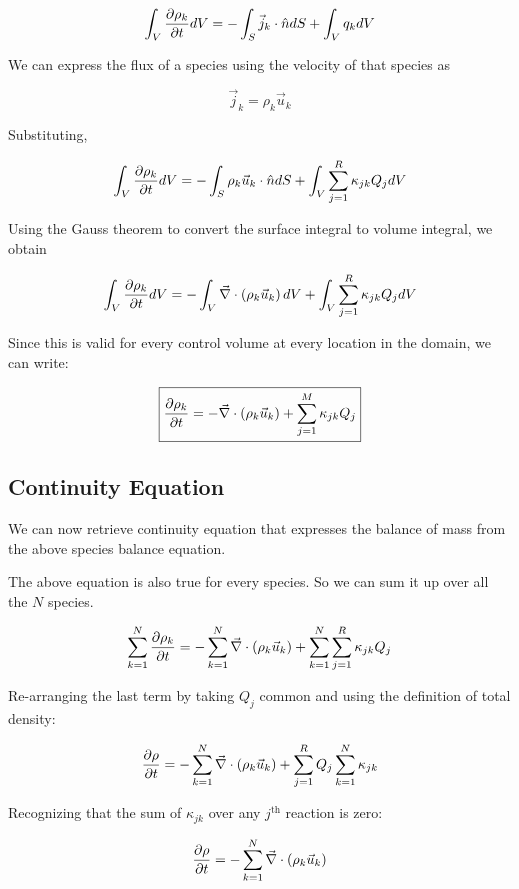 $$ \int_{V}{ {\partial \rho_k \over \partial t} dV} = - \int_{S}{ \vec{j}_k
\cdot
\hat{n} dS} + \int_{V}{q_k dV} $$

We can express the flux of a species using the velocity of that species as

$$\vec{j}_k = \rho_k \vec{u}_k$$

Substituting,

$$ \int_{V}{ {\partial \rho_k \over \partial t} dV} = - \int_{S}{ \rho_k
\vec{u}_k \cdot \hat{n} dS} + \int_{V}{\sum_{j=1}^{R}{\kappa_{jk}Q_j} dV} $$

Using the Gauss theorem to convert the surface integral to volume integral, we
obtain

$$ \int_{V}{ {\partial \rho_k \over \partial t} dV} = - \int_{V}{ \vec{\nabla} \cdot
\left(\rho_k \vec{u}_k \right) dV} + \int_{V}{\sum_{j=1}^{R}{\kappa_{jk}Q_j} dV}
$$

Since this is valid for every control volume at every location in the domain, we
can write:

\begin{equation}
\label{rhokuk1}
\boxed{
 {\partial \rho_k \over \partial t}  = - { \vec{\nabla} \cdot \left(\rho_k \vec{u}_k
\right) } + \sum_{j=1}^{M}{\kappa_{jk}Q_j}
}
\end{equation}

\subsection{Continuity Equation}
 
We can now retrieve continuity equation that expresses the balance of mass from
the above species balance equation.


The above equation is also true for every species. So we can sum it up over all
the $N$ species.

$$ \sum_{k=1}^{N}{\partial \rho_k \over \partial t}  = - \sum_{k=1}^{N}{ \vec{\nabla}
\cdot \left(\rho_k \vec{u}_k \right) } +
\sum_{k=1}^{N}{\sum_{j=1}^{R}{\kappa_{jk}Q_j} } $$

Re-arranging the last term by taking $Q_j$ common and using the definition of
total density:

$$ {\partial \rho \over \partial t}  = - \sum_{k=1}^{N}{ \vec{\nabla} \cdot
\left(\rho_k \vec{u}_k \right) } + \sum_{j=1}^{R} {Q_j
\sum_{k=1}^{N}{\kappa_{jk} } } $$

Recognizing that the sum of $\kappa_{jk}$ over any $j^\text{th}$ reaction is
zero:

$$ {\partial \rho \over \partial t}  = - \sum_{k=1}^{N}{ \vec{\nabla} \cdot
\left(\rho_k \vec{u}_k \right) } $$

